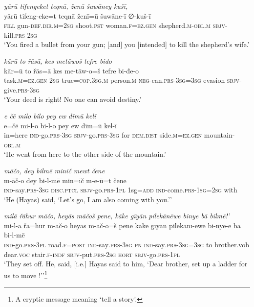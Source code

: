 \ea \label{KŠ.98}
\textit{yārū tifengeket teqnā, ženū šuwāney kušī,} \\ 
\gll yārū tifeng-eke=t teqnā ženī=ū šuwāne-ī ∅-kuš-ī \\ 
 \textsc{fill} gun\textsc{-def}\textsc{.dir}\textsc{.m}\textsc{=\textsc{2sg}} shoot\textsc{.pst} woman\textsc{.f}\textsc{\textsc{=ez.gen}} shepherd\textsc{.m}\textsc{-obl}\textsc{.m} \textsc{sbjv-}kill\textsc{.prs}-\textsc{2sg} \\ 
\glt `You fired a bullet from your gun; [and] you [intended] to kill the shepherd’s wife.'
\z 
 
\ea \label{KŠ.105}
\textit{kārū to řāsā, kes metāwoš tefre biđo} \\ 
\gll kār=ū to řās=ā kes me-tāw-o=š tefre bi-đe-o \\ 
 task\textsc{.m}\textsc{\textsc{=ez.gen}} \textsc{2sg} true\textsc{=cop}\textsc{.3sg}\textsc{.m} person\textsc{.m} \textsc{neg-}can\textsc{.prs}\textsc{-3sg}\textsc{=3sg} evasion \textsc{sbjv-}give\textsc{.prs}\textsc{-3sg} \\ 
\glt `Your deed is right! No one can avoid destiny.'
\z 
 
\ea \label{ŽH.5}
\textit{e čē milo bilo pey ew dīmū kelī} \\ 
\gll e=čē mi-l-o bi-l-o pey ew dīm=ū kel-ī \\ 
 in=here \textsc{ind-}go\textsc{.prs}\textsc{-3sg} \textsc{sbjv-}go\textsc{.prs}\textsc{-3sg} for \textsc{dem.dist} side\textsc{.m}\textsc{=ez}\textsc{.gen} mountain\textsc{-obl}\textsc{.m} \\ 
\glt `He went from here to the other side of the mountain.'
\z 
 
\ea \label{ŽH.11}
\textit{māčo, dey bilmē minīč mewt čene} \\ 
\gll m-āč-o dey bi-l-mē min=īč m-e-ū=t čene \\ 
 \textsc{ind-}say\textsc{.prs}\textsc{-3sg} \textsc{disc.ptcl} \textsc{sbjv-}go\textsc{.prs}\textsc{-1pl} 1sg\textsc{=add} \textsc{ind-}come\textsc{.prs}\textsc{-1sg}\textsc{=\textsc{2sg}} with \\ 
\glt `He (Hayas) said, ‘Let’s go, I am also coming with you.’'
\z 
 
\ea \label{ŽH.12}
\textit{milā řāhur māčo, heyās māčoš pene, kāke gīyān pilekānēwe binye bā bilmē!’} \\ 
\gll mi-l-ā řā=hur m-āč-o heyās m-āč-o=š pene kāke gīyān pilekānī-ēwe bi-nye-e bā bi-l-mē \\ 
 \textsc{ind-}go\textsc{.prs}\textsc{-3pl} road\textsc{\textsc{.f}}\textsc{=\textsc{post}} \textsc{ind-}say\textsc{.prs}\textsc{-3sg} \textsc{pn} \textsc{ind-}say\textsc{.prs}\textsc{-3sg}\textsc{=3sg} to brother.vob dear.\textsc{voc} stair\textsc{\textsc{.f}}\textsc{-indf} \textsc{sbjv-}put\textsc{.prs}-\textsc{2sg} \textsc{hort} \textsc{sbjv-}go\textsc{.prs}\textsc{-1pl} \\ 
\glt `They set off. He, said, [i.e.] Hayas said to him, ‘Dear brother, set up a ladder for us to move !’'\footnote{A cryptic message meaning ‘tell a story’.}
\z 
 
